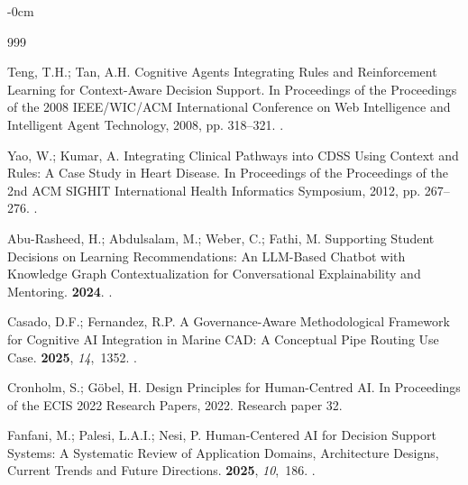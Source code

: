 \documentclass[mathematics,article,submit,moreauthors]{Definitions/mdpi}
\begin{document}

\begin{adjustwidth}{-\extralength}{0cm}
%

\begin{thebibliography}{999}

Teng, T.H.; Tan, A.H.
\newblock Cognitive Agents Integrating Rules and Reinforcement Learning for Context-Aware Decision Support.
\newblock In Proceedings of the Proceedings of the 2008 IEEE/WIC/ACM International Conference on Web Intelligence and Intelligent Agent Technology,  2008, pp. 318--321.
.

Yao, W.; Kumar, A.
\newblock Integrating Clinical Pathways into {CDSS} Using Context and Rules: A Case Study in Heart Disease.
\newblock In Proceedings of the Proceedings of the 2nd ACM SIGHIT International Health Informatics Symposium,  2012, pp. 267--276.
.

Abu-Rasheed, H.; Abdulsalam, M.; Weber, C.; Fathi, M.
\newblock Supporting Student Decisions on Learning Recommendations: An {LLM}-Based Chatbot with Knowledge Graph Contextualization for Conversational Explainability and Mentoring.
 {\bf 2024}.
.

Casado, D.F.; Fernandez, R.P.
\newblock A Governance-Aware Methodological Framework for Cognitive {AI} Integration in Marine {CAD}: A Conceptual Pipe Routing Use Case.
 {\bf 2025}, {\em 14},~1352.
.

Cronholm, S.; G{\"o}bel, H.
\newblock Design Principles for Human-Centred {AI}.
\newblock In Proceedings of the ECIS 2022 Research Papers,  2022.
\newblock Research paper 32.

Fanfani, M.; Palesi, L.A.I.; Nesi, P.
\newblock Human-Centered {AI} for Decision Support Systems: A Systematic Review of Application Domains, Architecture Designs, Current Trends and Future Directions.
 {\bf 2025}, {\em 10},~186.
.


\end{thebibliography}
\end{adjustwidth}
\end{document}
